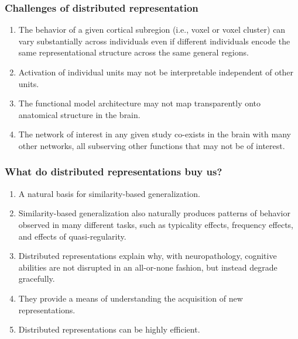 \documentclass{beamer}
\begin{document}
\begin{frame}
\frametitle{Challenges of distributed representation}
\begin{enumerate}
  \item The behavior of a given cortical subregion (i.e., voxel or voxel cluster) can vary substantially across individuals even if different individuals encode the same representational structure across the same general regions.
  \pause
  \item Activation of individual units may not be interpretable independent of other units.
  \pause
  \item The functional model architecture may not map transparently onto anatomical structure in the brain.
  \pause
  \item The network of interest in any given study co-exists in the brain with many other networks, all subserving other functions that may not be of interest.
\end{enumerate}
\end{frame}

\begin{frame}
\frametitle{What do distributed representations buy us?}
\begin{enumerate}
\pause \item A natural basis for similarity-based generalization.
\pause \item Similarity-based generalization also naturally produces patterns of behavior observed in many different tasks, such as typicality effects, frequency effects, and effects of quasi-regularity.  
\pause \item Distributed representations explain why, with neuropathology, cognitive abilities are not disrupted in an all-or-none fashion, but instead degrade gracefully.  
\pause \item They provide a means of understanding the acquisition of new representations.
\pause \item Distributed representations can be highly efficient. 
\end{enumerate}
\end{frame}
\end{document}
